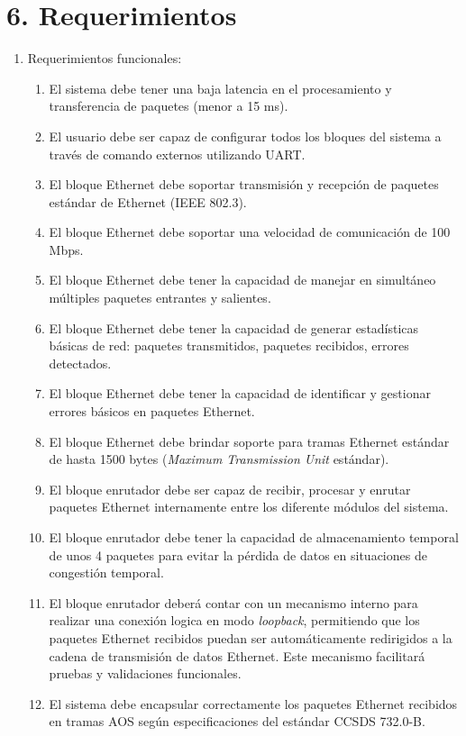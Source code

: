 \documentclass[
11pt, %
]{charter}
\begin{document}
\section{6. Requerimientos}
\label{sec:requerimientos}



\begin {enumerate}
	\item Requerimientos funcionales:
		\begin{enumerate}
			\item El sistema debe tener una baja latencia en el procesamiento y transferencia de paquetes (menor a 15 ms).				
			\item El usuario debe ser capaz de configurar todos los bloques del sistema a través de comando externos utilizando UART.
			\item El bloque Ethernet debe soportar transmisión y recepción de paquetes estándar de Ethernet (IEEE 802.3).
			\item El bloque Ethernet debe soportar una velocidad de comunicación de 100 Mbps.
			\item El bloque Ethernet debe tener la capacidad de manejar en simultáneo múltiples paquetes entrantes y salientes.
			\item El bloque Ethernet debe tener la capacidad de generar estadísticas básicas de red: paquetes transmitidos, paquetes recibidos, errores detectados.					
			\item El bloque Ethernet debe tener la capacidad de identificar y gestionar errores básicos en paquetes Ethernet.
			\item El bloque Ethernet debe brindar soporte para tramas Ethernet estándar de hasta 1500 bytes (\textit{Maximum Transmission Unit} estándar).
			\item El bloque enrutador debe ser capaz de recibir, procesar y enrutar paquetes Ethernet internamente entre los diferente módulos del sistema.
			\item El bloque enrutador debe tener la capacidad de almacenamiento temporal de unos 4 paquetes para evitar la pérdida de datos en situaciones de congestión temporal.
			\item El bloque enrutador deberá contar con un mecanismo interno para realizar una conexión logica en modo \textit{loopback}, permitiendo que los paquetes Ethernet recibidos puedan ser automáticamente redirigidos a la cadena de transmisión de datos Ethernet. Este mecanismo facilitará pruebas y validaciones funcionales.
			\item El sistema debe encapsular correctamente los paquetes Ethernet recibidos en tramas AOS según especificaciones del estándar CCSDS 732.0-B.

\end{enumerate}
\end{enumerate}
\end{document}
